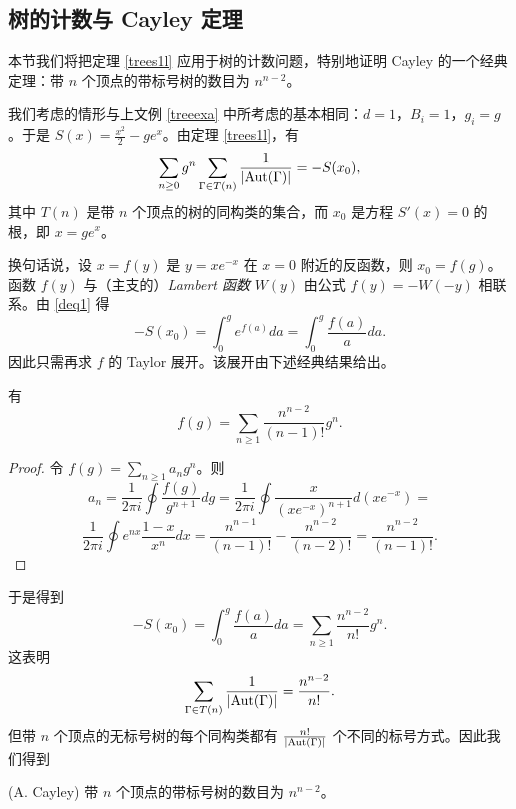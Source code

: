 \subsection{树的计数与 Cayley 定理}

本节我们将把定理 \ref{trees1l} 应用于树的计数问题，特别地证明 Cayley 的一个经典定理：带 $n$ 个顶点的带标号树的数目为 $n^{n-2}$。

我们考虑的情形与上文例 \ref{treeexa} 中所考虑的基本相同：$d=1$，$B_i=1$，$g_i=g$。于是 $S(x)=\frac{x^2}{2}-ge^x$。由定理 \ref{trees1l}，有
$$
\sum_{n\ge 0}g^n\sum_{\Gamma \in T(n)}\frac{1}{|{\rm Aut}(\Gamma)|}=
-S(x_0),
$$
其中 $T(n)$ 是带 $n$ 个顶点的树的同构类的集合，而 $x_0$ 是方程 $S'(x)=0$ 的根，即 $x=ge^x$。

换句话说，设 $x=f(y)$ 是 $y=xe^{-x}$ 在 $x=0$ 附近的反函数，则 $x_0=f(g)$。函数 $f(y)$ 与（主支的）\emph{Lambert 函数} $W(y)$ 由公式 $f(y)=-W(-y)$ 相联系。由 \eqref{deq1} 得
$$
-S(x_0)=\int_0^g e^{f(a)}da=\int_0^g\frac{f(a)}{a}da.
$$
因此只需再求 $f$ 的 Taylor 展开。该展开由下述经典结果给出。

\begin{proposition}
有
$$
f(g)=\sum_{n\ge 1}\frac{n^{n-2}}{(n-1)!}g^n.
$$
\end{proposition}

\begin{proof}
令 $f(g)=\sum_{n\ge 1}a_ng^n$。则
$$
a_n=\frac{1}{2\pi i}\oint\frac{f(g)}{g^{n+1}}dg=
\frac{1}{2\pi i}\oint\frac{x}{(xe^{-x})^{n+1}}d(xe^{-x})=
$$
$$
\frac{1}{2\pi i}\oint e^{nx}\frac{1-x}{x^n}dx=
\frac{n^{n-1}}{(n-1)!}-\frac{n^{n-2}}{(n-2)!}=
\frac{n^{n-2}}{(n-1)!}.
$$
\end{proof}


于是得到
$$
-S(x_0)=\int_0^g\frac{f(a)}{a}da=\sum_{n\ge 1}\frac{n^{n-2}}{n!}g^n.
$$
这表明
$$
\sum_{\Gamma\in T(n)}\frac{1}{|{\rm Aut}(\Gamma)|}=\frac{n^{n-2}}{n!}.
$$
但带 $n$ 个顶点的无标号树的每个同构类都有 $\frac{n!}{|{\rm Aut}(\Gamma)|}$ 个不同的标号方式。因此我们得到

\begin{corollary} (A. Cayley) 带 $n$ 个顶点的带标号树的数目为 $n^{n-2}$。
\end{corollary}

